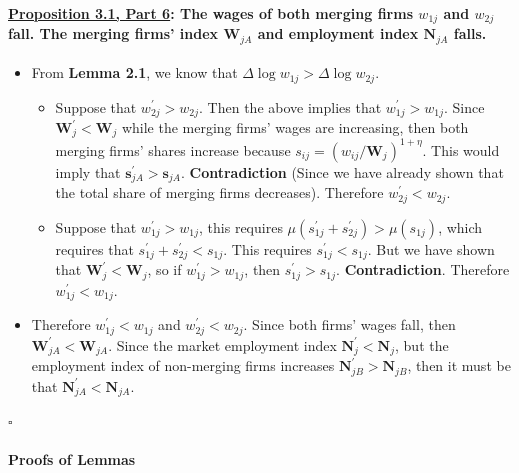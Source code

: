 \documentclass[12pt]{article}
\theoremstyle{prop}
\begin{document}
\paragraph{\underline{Proposition 3.1, Part 6}: The wages of both merging firms $w_{1j}$ and $w_{2j}$ fall. The
	merging firms' index $\mathbf{W}_{jA}$ and employment index $\mathbf{N}_{jA}$
	falls.}
\begin{itemize}
	\item From \textbf{Lemma 2.1}, we know that $\Delta\log w_{1j}>\Delta\log w_{2j}$.
	\begin{itemize}
		\item Suppose that $w_{2j}^{\prime}>w_{2j}$. Then the above implies that
		$w_{1j}^{\prime}>w_{1j}$. Since $\mathbf{W}_{j}^{\prime}<\mathbf{W}_{j}$
		 while the merging firms' wages are increasing, then both merging
		firms' shares increase because $s_{ij}=\left(w_{ij}/\mathbf{W}_{j}\right)^{1+\eta}$.
		This would imply that $\boldsymbol{s}_{jA}^{\prime}>\boldsymbol{s}_{jA}$.
		\textbf{Contradiction} (Since we have already shown that the total
		share of merging firms decreases). Therefore $w_{2j}^{\prime}<w_{2j}.$
		\item Suppose that $w_{1j}^{\prime}>w_{1j}$, this requires $\mu\left(s_{1j}^{\prime}+s_{2j}^{\prime}\right)>\mu\left(s_{1j}\right)$,
		which requires that $s_{1j}^{\prime}+s_{2j}^{\prime}<s_{1j}$. This requires
		$s_{1j}^{\prime}<s_{1j}$. But we have shown that $\mathbf{W}_{j}^{\prime}<\mathbf{W}_{j}$,
		so if $w_{1j}^{\prime}>w_{1j}$, then $s_{1j}^{\prime}>s_{1j}$. \textbf{Contradiction}.
		Therefore $w_{1j}^{\prime}<w_{1j}.$
	\end{itemize}
	\item Therefore $w_{1j}^{\prime}<w_{1j}$ and $w_{2j}^{\prime}<w_{2j}$.
	Since both firms' wages fall, then $\mathbf{W}_{jA}^{\prime}<\mathbf{W}_{jA}$.
	Since the market employment index $\mathbf{N}_{j}^{\prime}<\mathbf{N}_{j}$,
	but the employment index of non-merging firms increases $\mathbf{N}_{jB}^{\prime}>\mathbf{N}_{jB}$,
	then it must be that $\mathbf{N}_{jA}^{\prime}<\mathbf{N}_{jA}$.
\end{itemize}
 \begin{flushright}
      $\square$
 \end{flushright}

\bigskip

\paragraph{Proofs of Lemmas}
\end{document}
